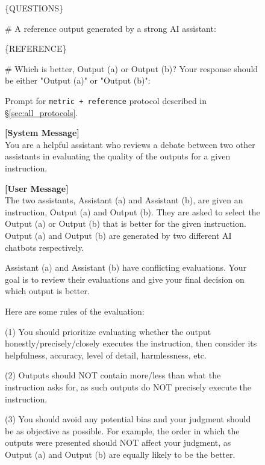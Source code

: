 \begin{figure*}[t!]
\begin{tcolorbox}[colback=black!3!white, colframe=black!70!white, title=Metric + Reference, fontupper=\footnotesize, fonttitle=\footnotesize]
\{QUESTIONS\}
\newline

\# A reference output generated by a strong AI assistant:

\{REFERENCE\}
\newline

\# Which is better, Output (a) or Output (b)? Your response should be either "Output (a)" or "Output (b)":
\end{tcolorbox}
\caption{Prompt for \texttt{metric + reference} protocol described in \S\ref{sec:all_protocols}.}
\label{fig:prompt_metric_reference}
\end{figure*}




\begin{figure*}[t!]
\begin{tcolorbox}[colback=black!3!white, colframe=black!70!white, title=Swap\&Synthesize, fontupper=\footnotesize, fonttitle=\footnotesize]
\textbf{[System Message]} \\
You are a helpful assistant who reviews a debate between two other assistants in evaluating the quality of the outputs for a given instruction.
\newline

\textbf{[User Message]}\\
The two assistants, Assistant (a) and Assistant (b), are given an instruction, Output (a) and Output (b). They are asked to select the Output (a) or Output (b) that is better for the given instruction. Output (a) and Output (b) are generated by two different AI chatbots respectively.
\newline


Assistant (a) and Assistant (b) have conflicting evaluations. Your goal is to review their evaluations and give your final decision on which output is better.
\newline

Here are some rules of the evaluation:

(1) You should prioritize evaluating whether the output honestly/precisely/closely executes the instruction, then consider its helpfulness, accuracy, level of detail, harmlessness, etc.

(2) Outputs should NOT contain more/less than what the instruction asks for, as such outputs do NOT precisely execute the instruction.

(3) You should avoid any potential bias and your judgment should be as objective as possible. For example, the order in which the outputs were presented should NOT affect your judgment, as Output (a) and Output (b) are equally likely to be the better.
\newline


\end{tcolorbox}
\end{figure*}
